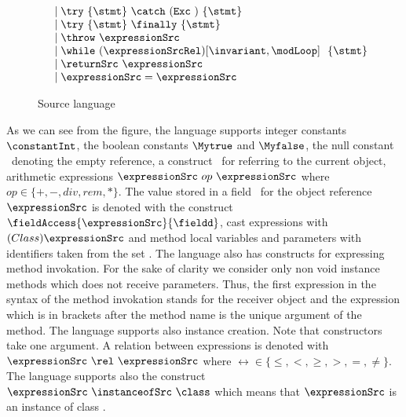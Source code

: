 \begin{figure}[ht!]
\begin{frameit}
$$\begin{array} {ll}
			        & \mid \try  \ \{ \stmt \}  \ \catch \ ( \mbox{\rm\texttt{Exc} } )\ \{ \stmt \} \\
		                & \mid \try  \ \{ \stmt \} \ \finally \ \{ \stmt \} \\
				& \mid \throw \ \expressionSrc  \\
                                & \mid \while \ (\expressionSrcRel) \lbrack \invariant, \modLoop \rbrack \ \do \ \{ \stmt \}\ \\
				& \mid \returnSrc \  \expressionSrc \\
                   		& \mid \expressionSrc = \expressionSrc \\        
    \end{array} $$
\caption{\sc Source language}
\label{source:grammar}
\end{frameit}
\end{figure}


    As we can see from the figure, the language supports 
    integer constants $\constantInt$, the boolean constants  $ \Mytrue$ and $\Myfalse$, the null constant \Mynull \ 
    denoting  the empty reference, a construct \this \ for referring to the current object,  
    arithmetic expressions  $\expressionSrc \ op \ \expressionSrc$ where $op \in  \{+ , - , div , rem, * \}$.
    The value stored in a field \fieldd \ for the object reference $\expressionSrc $ is denoted with
    the construct  $ \fieldAccess{\expressionSrc}{\fieldd} $, cast expressions with   $(Class) \expressionSrc$
    and method local variables  and parameters with identifiers taken from the set \var.  
    The language also has constructs for expressing method invokation.  For the sake of clarity we consider only non void  instance  methods which does not 
    receive parameters.
    Thus, the first expression in the syntax of the method invokation stands for the receiver object and 
    the expression which is in brackets after the  method name is the unique argument of the  method.
    The language supports also instance creation. Note that constructors take one argument.
    A relation between    expressions is denoted with
     $\expressionSrc \ \rel \ \expressionSrc $ where $\rel  \in \{ \le, < ,  \ge, >, = , \neq \}$. 
     The language supports also the construct  $\expressionSrc \ \instanceofSrc \ \class$ which means that
     $\expressionSrc$ is an instance of class \class.
    
